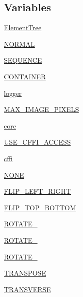 \subsection*{Variables}
\begin{DoxyCompactItemize}
\item 
\hyperlink{namespacePIL_1_1Image_a81e0f0b903760cdef37f3682b186dac4}{Element\+Tree}
\item 
\hyperlink{namespacePIL_1_1Image_afc55287a446f605d0cd0a3c1c789f7a4}{N\+O\+R\+M\+AL}
\item 
\hyperlink{namespacePIL_1_1Image_adcda7192adc4c3fe97e58749376db60f}{S\+E\+Q\+U\+E\+N\+CE}
\item 
\hyperlink{namespacePIL_1_1Image_a9e4329502239e02f84e2fbea09ea2f5f}{C\+O\+N\+T\+A\+I\+N\+ER}
\item 
\hyperlink{namespacePIL_1_1Image_a5736b308e4bf8ecc52f987cd086ede43}{logger}
\item 
\hyperlink{namespacePIL_1_1Image_a4698dd15f59c449143338ae9c663fdf5}{M\+A\+X\+\_\+\+I\+M\+A\+G\+E\+\_\+\+P\+I\+X\+E\+LS}
\item 
\hyperlink{namespacePIL_1_1Image_a257b75e94619cf8c1261f0f11c8c885a}{core}
\item 
\hyperlink{namespacePIL_1_1Image_acba4dd1cb0a715a10068a6478da7b000}{U\+S\+E\+\_\+\+C\+F\+F\+I\+\_\+\+A\+C\+C\+E\+SS}
\item 
\hyperlink{namespacePIL_1_1Image_aa7920aa09d9831d08a20758c4fd09831}{cffi}
\item 
\hyperlink{namespacePIL_1_1Image_aa76bf294f5c3e3c3b91d25dddaaf6f2c}{N\+O\+NE}
\item 
\hyperlink{namespacePIL_1_1Image_a45486d97e90b79b2dd017092b20a8380}{F\+L\+I\+P\+\_\+\+L\+E\+F\+T\+\_\+\+R\+I\+G\+HT}
\item 
\hyperlink{namespacePIL_1_1Image_a6b930b47275bc38b5ad4f2abb516f5b5}{F\+L\+I\+P\+\_\+\+T\+O\+P\+\_\+\+B\+O\+T\+T\+OM}
\item 
\hyperlink{namespacePIL_1_1Image_a60af109a9a3c8b5361ddd435f1dea351}{R\+O\+T\+A\+T\+E\+\_}
\item 
\hyperlink{namespacePIL_1_1Image_aa4a04a2070de9c83eebb1fd33fc4bf23}{R\+O\+T\+A\+T\+E\+\_}
\item 
\hyperlink{namespacePIL_1_1Image_a22e7a0479a568252ea0fa3a19a4cb4de}{R\+O\+T\+A\+T\+E\+\_}
\item 
\hyperlink{namespacePIL_1_1Image_a2fc65d9c7c8f23145c785c9b4d84546d}{T\+R\+A\+N\+S\+P\+O\+SE}
\item 
\hyperlink{namespacePIL_1_1Image_a93476f7de38bf210e5dc8a73c898ca18}{T\+R\+A\+N\+S\+V\+E\+R\+SE}

\end{DoxyCompactItemize}
